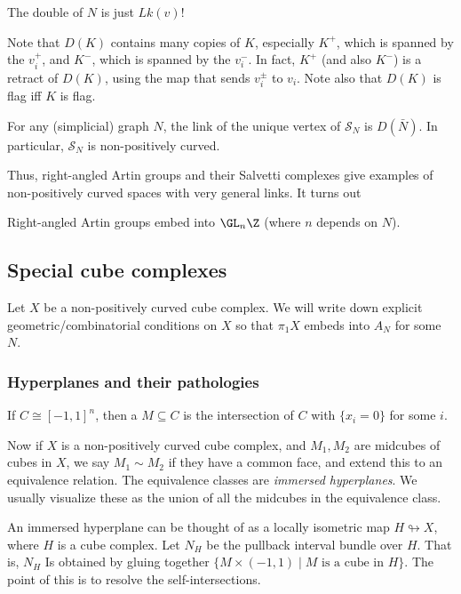 \documentclass[a4paper]{article}
\begin{document}
\begin{eg}
  The double of $N$ is just $Lk(v)$!
\end{eg}

Note that $D(K)$ contains many copies of $K$, especially $K^+$, which is spanned by the $v_i^+$, and $K^-$, which is spanned by the $v_i^-$. In fact, $K^+$ (and also $K^-$) is a retract of $D(K)$, using the map that sends $v^{\pm}_i$ to $v_i$. Note also that $D(K)$ is flag iff $K$ is flag.

\begin{lemma}
  For any (simplicial) graph $N$, the link of the unique vertex of $\mathcal{S}_N$ is $D(\bar{N})$. In particular, $\mathcal{S}_N$ is non-positively curved.
\end{lemma}

Thus, right-angled Artin groups and their Salvetti complexes give examples of non-positively curved spaces with very general links. It turns out

\begin{thm}
  Right-angled Artin groups embed into $\GL_n\Z$ (where $n$ depends on $N$).
\end{thm}

\subsection{Special cube complexes}
Let $X$ be a non-positively curved cube complex. We will write down explicit geometric/combinatorial conditions on $X$ so that $\pi_1 X$ embeds into $A_N$ for some $N$.

\subsubsection*{Hyperplanes and their pathologies}
If $C \cong [-1, 1]^n$, then a  $M \subseteq C$ is the intersection of $C$ with $\{x_i = 0\}$ for some $i$.


Now if $X$ is a non-positively curved cube complex, and $M_1, M_2$ are midcubes of cubes in $X$, we say $M_1 \sim M_2$ if they have a common face, and extend this to an equivalence relation. The equivalence classes are \emph{immersed hyperplanes}. We usually visualize these as the union of all the midcubes in the equivalence class.

An immersed hyperplane can be thought of as a locally isometric map $H \looparrowright X$, where $H$ is a cube complex. Let $N_H$ be the pullback interval bundle over $H$. That is, $N_H$ Is obtained by gluing together $\{M \times (-1, 1) \mid M\text{ is a cube in }H\}$. The point of this is to resolve the self-intersections.
\end{document}
